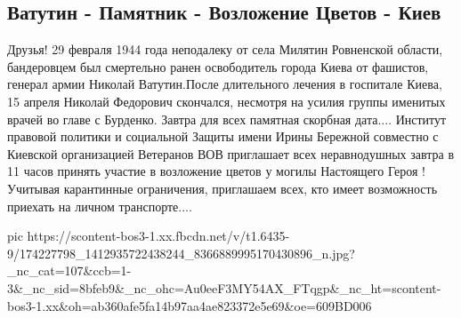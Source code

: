  
 
 
 
 

\subsection{Ватутин - Памятник - Возложение Цветов - Киев}

Друзья! 29 февраля 1944 года неподалеку от села Милятин Ровненской области,
бандеровцем был смертельно ранен освободитель города Киева от фашистов,
генерал армии Николай Ватутин.После длительного лечения в госпитале Киева, 15
апреля Николай Федорович скончался, несмотря на усилия группы именитых врачей
во главе с Бурденко. Завтра для всех памятная скорбная дата.... Институт
правовой политики и социальной Защиты имени Ирины Бережной совместно с Киевской
организацией Ветеранов ВОВ приглашает  всех неравнодушных  завтра в 11 часов
принять участие в возложение цветов у могилы Настоящего Героя ! Учитывая
карантинные ограничения, приглашаем всех, кто имеет возможность приехать на
личном транспорте....


\ifcmt
  pic https://scontent-bos3-1.xx.fbcdn.net/v/t1.6435-9/174227798_1412935722438244_8366889995170430896_n.jpg?_nc_cat=107&ccb=1-3&_nc_sid=8bfeb9&_nc_ohc=Au0eeF3MY54AX_FTqgp&_nc_ht=scontent-bos3-1.xx&oh=ab360afe5fa14b97aa4ae823372e5e69&oe=609BD006
\fi

